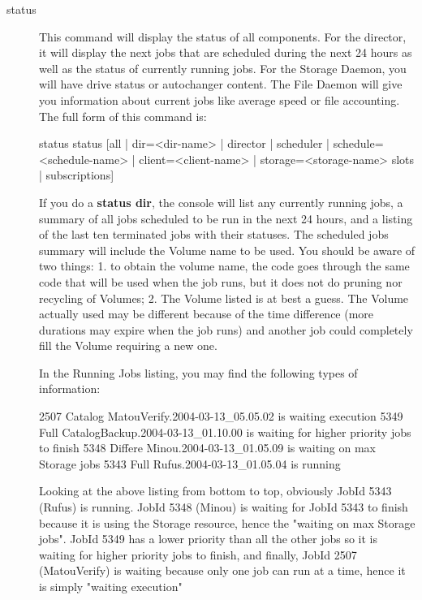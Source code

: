 \begin{description}
\item [status]

   This command will display the status of all components. For the director, it
   will display the next jobs that are scheduled during the next 24 hours as
   well as the status of currently running jobs. For the Storage Daemon, you
   will have drive status or autochanger content. The File Daemon will give you
   information about current jobs like average speed or file accounting. The
   full form of this command is:

\begin{bconsole}{status}
status [all | dir=<dir-name> | director | scheduler | schedule=<schedule-name> |
        client=<client-name> | storage=<storage-name> slots | subscriptions]
\end{bconsole}

   If you do a {\bf status dir}, the console will list any currently
   running jobs, a summary of all jobs scheduled to be run in the next 24
   hours, and a listing of the last ten terminated jobs with their statuses.
   The scheduled jobs summary will include the Volume name to be used.  You
   should be aware of two things: 1. to obtain the volume name, the code
   goes through the same code that will be used when the job runs, but it
   does not do pruning nor recycling of Volumes; 2.  The Volume listed is
   at best a guess.  The Volume actually used may be different because of
   the time difference (more durations may expire when the job runs) and
   another job could completely fill the Volume requiring a new one.

   In the Running Jobs listing, you may find the following types of
   information:

\begin{bconsole}{}
2507 Catalog MatouVerify.2004-03-13_05.05.02 is waiting execution
5349 Full    CatalogBackup.2004-03-13_01.10.00 is waiting for higher
             priority jobs to finish
5348 Differe Minou.2004-03-13_01.05.09 is waiting on max Storage jobs
5343 Full    Rufus.2004-03-13_01.05.04 is running
\end{bconsole}

   Looking at the above listing from bottom to top, obviously JobId 5343
   (Rufus) is running.  JobId 5348 (Minou) is waiting for JobId 5343 to
   finish because it is using the Storage resource, hence the "waiting on
   max Storage jobs".  JobId 5349 has a lower priority than all the other
   jobs so it is waiting for higher priority jobs to finish, and finally,
   JobId 2507 (MatouVerify) is waiting because only one job can run at a
   time, hence it is simply "waiting execution"


\end{description}
